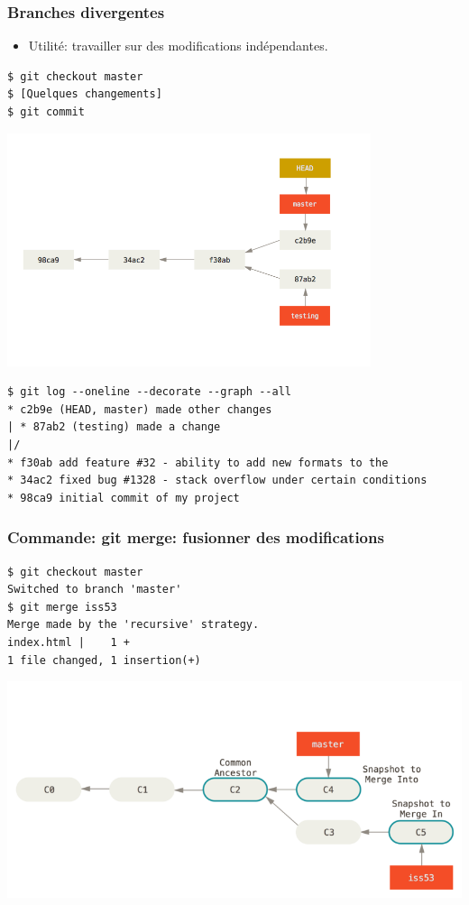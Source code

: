 \documentclass{beamer}
\begin{document}
\begin{frame}[fragile]
    \frametitle{Branches divergentes}
    \begin{itemize}
        \item Utilité: travailler sur des modifications indépendantes.
    \end{itemize}
\begin{lstlisting}
$ git checkout master
$ [Quelques changements]
$ git commit
\end{lstlisting}
    \begin{center}
        \includegraphics[width=0.8\textwidth]{img/advance-master.png}
    \end{center}
\end{frame}

\begin{frame}[fragile]
\begin{lstlisting}
$ git log --oneline --decorate --graph --all
* c2b9e (HEAD, master) made other changes
| * 87ab2 (testing) made a change
|/
* f30ab add feature #32 - ability to add new formats to the
* 34ac2 fixed bug #1328 - stack overflow under certain conditions
* 98ca9 initial commit of my project
\end{lstlisting}
\end{frame}

\begin{frame}[fragile]
    \frametitle{Commande: git merge: fusionner des modifications}
\begin{lstlisting}
$ git checkout master
Switched to branch 'master'
$ git merge iss53
Merge made by the 'recursive' strategy.
index.html |    1 +
1 file changed, 1 insertion(+)
\end{lstlisting}
\begin{center}
    \includegraphics[width=\textwidth,trim=0 0 0 40, clip]{img/basic-merging-1.png}
\end{center}
\end{frame}
\end{document}
